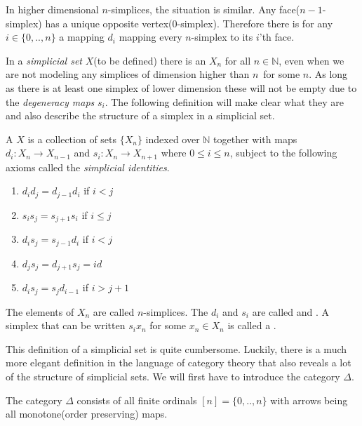 \documentclass[../../main.tex]{subfiles}
\begin{document}
    In higher dimensional $n$-simplices, the situation is similar. Any face($n-1$-simplex) has a unique opposite vertex($0$-simplex). Therefore there is for any $i \in \{0,..,n\}$ a mapping $d_i$ mapping every $n$-simplex to its $i$'th face.

    In a \emph{simplicial set} $X$(to be defined) there is an $X_n$ for all $n \in \mathbb{N}$, even when we are not modeling any simplices of dimension higher than $n$ for some $n$. As long as there is at least one simplex of lower dimension these will not be empty due to the \emph{degeneracy maps} $s_i$. The following definition will make clear what they are and also describe the structure of a simplex in a simplicial set.

    \begin{definition}\label{simplicial-set}
        A  $X$ is a collection of sets $\{X_n\}$ indexed over $\mathbb{N}$ together with maps $d_i: X_n \to X_{n-1}$ and $s_i: X_n\to X_{n+1}$ where $0 \leq i \leq n$, subject to the following axioms called the \emph{simplicial identities}.
        
        \begin{enumerate}
            \item $d_id_j = d_{j-1}d_i$ if $i < j$
            \item $s_is_j = s_{j+1}s_i$ if $i \leq j$
            \item $d_is_j = s_{j-1}d_i$ if $i < j$
            \item $d_js_j = d_{j+1}s_j = id$
            \item $d_is_j = s_jd_{i-1}$ if $i > j+1$
        \end{enumerate}
    \end{definition}

    The elements of $X_n$ are called $n$-simplices. The $d_i$ and $s_i$ are called  and . A simplex that can be written $s_ix_n$ for some $x_n \in X_n$ is called a .
    
    This definition of a simplicial set is quite cumbersome. Luckily, there is a much more elegant definition in the language of category theory that also reveals a lot of the structure of simplicial sets. We will first have to introduce the category $\Delta$.

    \begin{definition}
        The category $\Delta$ consists of all finite ordinals $[n] = \{0, .., n\}$ with arrows being all monotone(order preserving) maps.
    \end{definition}
\end{document}
